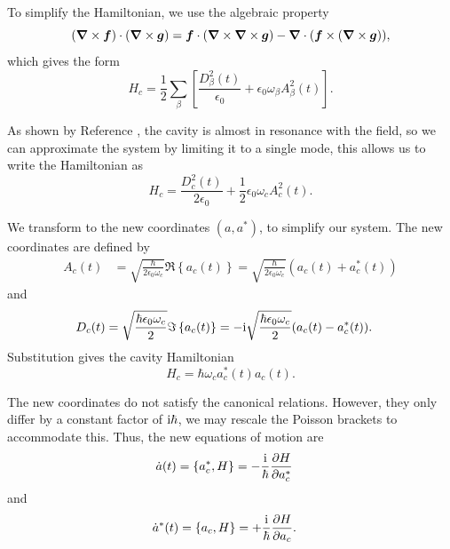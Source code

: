 To simplify the Hamiltonian,
    we use the algebraic property
\begin{equation}
(\bm{\nabla} \times \bm{f})\cdot (\bm{\nabla} \times \bm{g}) = 
    \bm{f}\cdot(\bm{\nabla} \times\bm{\nabla} \times \bm{g})
    - \bm{\nabla} \cdot (\bm{f} \times (\bm{\nabla} \times \bm{g})),
\end{equation}
which gives the form
\begin{equation}
    H_c = \frac{1}{2} \sum_\beta \left[ 
        \frac{D_\beta^2(t)}{\epsilon_0} 
        + \epsilon_0 \omega_\beta A_\beta^2(t)
    \right].
\end{equation}

As shown by Reference \cite{Gonzalez_Ballestero_2019},
    the cavity is almost in resonance with the field,
    so we can approximate the system by limiting it to a single  mode,
    this allows us to write the Hamiltonian as
\begin{equation}
    H_c = \frac{D_c^2(t)}{2\epsilon_0} 
        + \frac{1}{2}\epsilon_0 \omega_c A_c^2(t).
\end{equation}

We transform to the new coordinates $(a, a^*)$, 
    to simplify our system.
The new coordinates are defined by
\begin{align}
    A_c(t) 
        &= \sqrt{\frac{\hbar}{2\epsilon_0 \omega_c}}\Re\left\{a_c(t)\right\} 
         =  \sqrt{\frac{\hbar}{2\epsilon_0 \omega_c}} \left(a_c(t) + a_c^*(t)\right) 
\end{align}
and 
\begin{align}
D_c(t) 
        &= \sqrt{\frac{\hbar \epsilon_0 \omega_c}{2}} \Im\left\{a_c(t)\right\}
         = -\mathrm{i}\sqrt{\frac{\hbar \epsilon_0 \omega_c}{2}} (a_c(t) - a_c^*(t)).
\end{align}
Substitution gives the cavity Hamiltonian 
\begin{equation}
    H_c = \hbar \omega_c a_c^*(t)a_c(t).
\end{equation}

The new coordinates do not satisfy the canonical relations. 
However, they only differ by a constant factor of $\mathrm{i} \hbar$, 
    we may rescale the Poisson brackets to accommodate this.
Thus, the new equations of motion are
\begin{align}
\label{eq:sp:eom:adot}
    \dot a(t) &= \{a_c^*, H\} = -\frac{\mathrm{i}}{\hbar} \frac{\partial H}{\partial a_c^*}
\end{align}
    and
\begin{align}
    \dot a^*(t) &= \{a_c, H\} = +\frac{\mathrm{i}}{\hbar} \frac{\partial H}{\partial a_c}.
\end{align}


